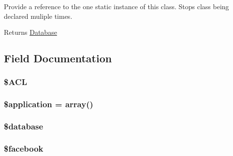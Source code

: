 Provide a reference to the one static instance of this class. Stops class being declared muliple times.

\begin{DoxyReturn}{Returns}
\hyperlink{namespaceDatabase}{Database} 
\end{DoxyReturn}


\subsection{Field Documentation}
\hypertarget{classImpact__Superclass_a0e6e927aed984ad8947f77bf803b70bb}{
\subsubsection[{\$ACL}]{\setlength{\rightskip}{0pt plus 5cm}\${\bf ACL}}}
\label{classImpact__Superclass_a0e6e927aed984ad8947f77bf803b70bb}
\hypertarget{classImpact__Superclass_a537fa9b460dddc2a67074faab810398a}{
\subsubsection[{\$application}]{\setlength{\rightskip}{0pt plus 5cm}\$application = array()}}
\label{classImpact__Superclass_a537fa9b460dddc2a67074faab810398a}
\hypertarget{classImpact__Superclass_a7691c0162d89de0b6ba47edcd8ba8878}{
\subsubsection[{\$database}]{\setlength{\rightskip}{0pt plus 5cm}\$database}}
\label{classImpact__Superclass_a7691c0162d89de0b6ba47edcd8ba8878}
\hypertarget{classImpact__Superclass_a4b9bb5e9f7a5ea9381bdbe31c44e9339}{
\subsubsection[{\$facebook}]{\setlength{\rightskip}{0pt plus 5cm}\$facebook}}
